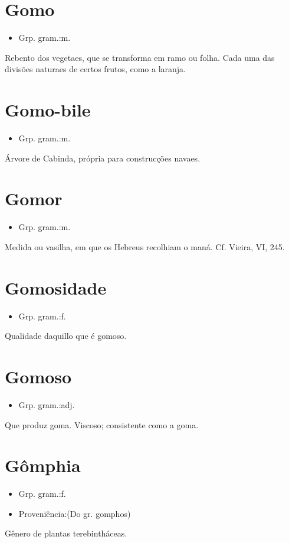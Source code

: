 \section{Gomo}
\begin{itemize}
\item {Grp. gram.:m.}
\end{itemize}
Rebento dos vegetaes, que se transforma em ramo ou folha.
Cada uma das divisões naturaes de certos frutos, como a laranja.
\section{Gomo-bile}
\begin{itemize}
\item {Grp. gram.:m.}
\end{itemize}
Árvore de Cabinda, própria para construcções navaes.
\section{Gomor}
\begin{itemize}
\item {Grp. gram.:m.}
\end{itemize}
Medida ou vasilha, em que os Hebreus recolhiam o maná. Cf. Vieira, VI, 245.
\section{Gomosidade}
\begin{itemize}
\item {Grp. gram.:f.}
\end{itemize}
Qualidade daquillo que é gomoso.
\section{Gomoso}
\begin{itemize}
\item {Grp. gram.:adj.}
\end{itemize}
Que produz goma.
Viscoso; consistente como a goma.
\section{Gômphia}
\begin{itemize}
\item {Grp. gram.:f.}
\end{itemize}
\begin{itemize}
\item {Proveniência:(Do gr. \textunderscore gomphos\textunderscore )}
\end{itemize}
Gênero de plantas terebintháceas.

